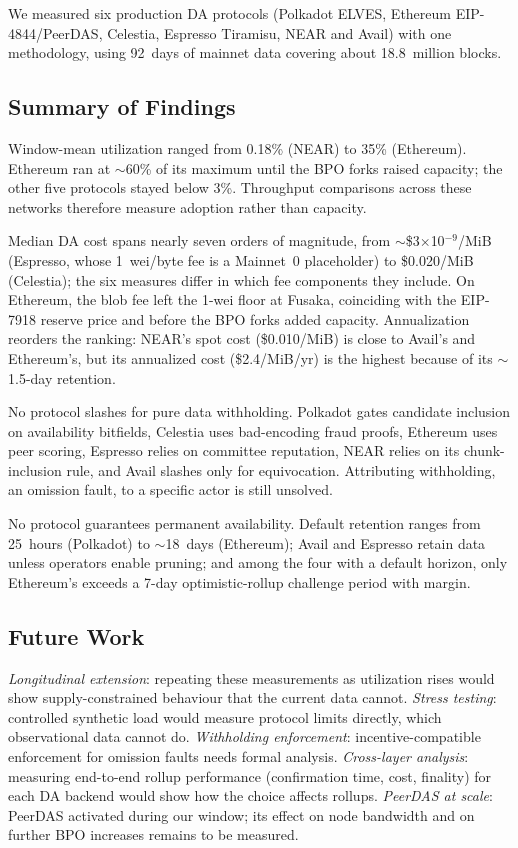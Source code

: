 
We measured six production DA protocols (Polkadot ELVES, Ethereum EIP-4844/PeerDAS, Celestia, Espresso Tiramisu, NEAR and Avail) with one methodology, using 92~days of mainnet data covering about 18.8~million blocks.

\subsection{Summary of Findings}

Window-mean utilization ranged from 0.18\% (NEAR) to 35\% (Ethereum). Ethereum ran at $\sim$60\% of its maximum until the BPO forks raised capacity; the other five protocols stayed below 3\%.
Throughput comparisons across these networks therefore measure adoption rather than capacity.

Median DA cost spans nearly seven orders of magnitude, from $\sim$\$3$\times$10$^{-9}$/MiB (Espresso, whose 1~wei/byte fee is a Mainnet~0 placeholder) to \$0.020/MiB (Celestia); the six measures differ in which fee components they include.
On Ethereum, the blob fee left the 1-wei floor at Fusaka, coinciding with the EIP-7918 reserve price and before the BPO forks added capacity.
Annualization reorders the ranking: NEAR's spot cost (\$0.010/MiB) is close to Avail's and Ethereum's, but its annualized cost (\$2.4/MiB/yr) is the highest because of its $\sim$1.5-day retention.

No protocol slashes for pure data withholding.
Polkadot gates candidate inclusion on availability bitfields, Celestia uses bad-encoding fraud proofs, Ethereum uses peer scoring, Espresso relies on committee reputation, NEAR relies on its chunk-inclusion rule, and Avail slashes only for equivocation.
Attributing withholding, an omission fault, to a specific actor is still unsolved.

No protocol guarantees permanent availability.
Default retention ranges from 25~hours (Polkadot) to $\sim$18~days (Ethereum); Avail and Espresso retain data unless operators enable pruning; and among the four with a default horizon, only Ethereum's exceeds a 7-day optimistic-rollup challenge period with margin.

\subsection{Future Work}

\emph{Longitudinal extension}: repeating these measurements as utilization rises would show supply-constrained behaviour that the current data cannot.
\emph{Stress testing}: controlled synthetic load would measure protocol limits directly, which observational data cannot do.
\emph{Withholding enforcement}: incentive-compatible enforcement for omission faults needs formal analysis.
\emph{Cross-layer analysis}: measuring end-to-end rollup performance (confirmation time, cost, finality) for each DA backend would show how the choice affects rollups.
\emph{PeerDAS at scale}: PeerDAS activated during our window; its effect on node bandwidth and on further BPO increases remains to be measured.
